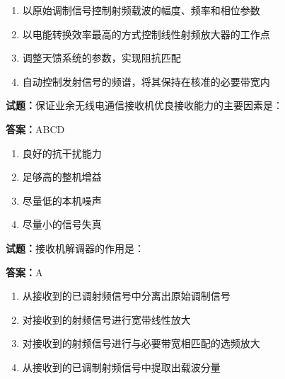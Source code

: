 \documentclass{ctexbook}
\begin{document}
\begin{enumerate}[leftmargin=3em]
  \item 以原始调制信号控制射频载波的幅度、频率和相位参数 

  \item 以电能转换效率最高的方式控制线性射频放大器的工作点 

  \item 调整天馈系统的参数，实现阻抗匹配 

  \item 自动控制发射信号的频谱，将其保持在核准的必要带宽内 

\end{enumerate}





\vspace{1em}

\textbf{试题：}保证业余无线电通信接收机优良接收能力的主要因素是： 

\textbf{答案：}ABCD 

\begin{enumerate}[leftmargin=3em]
  \item 良好的抗干扰能力 

  \item 足够高的整机增益 

  \item 尽量低的本机噪声 

  \item 尽量小的信号失真 

\end{enumerate}





\vspace{1em}

\textbf{试题：}接收机解调器的作用是： 

\textbf{答案：}A 


\begin{enumerate}[leftmargin=3em]
  \item 从接收到的已调射频信号中分离出原始调制信号 

  \item 对接收到的射频信号进行宽带线性放大 

  \item 对接收到的射频信号进行与必要带宽相匹配的选频放大 

  \item 从接收到的已调制射频信号中提取出载波分量 

\end{enumerate}
\end{document}
